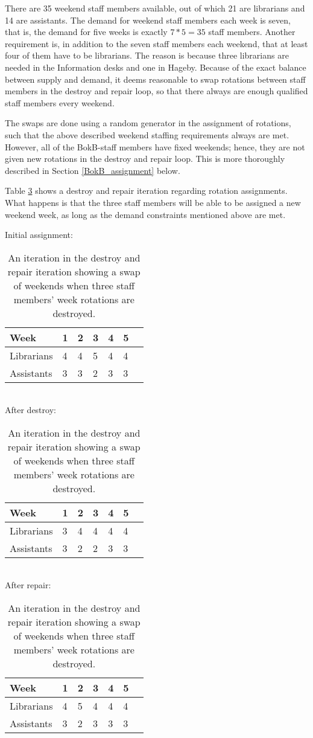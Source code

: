 There are 35 weekend staff members available, out of which 21 are librarians and 14 are assistants. The demand for weekend staff members each week is seven, that is, the demand for five weeks is exactly $7*5 = 35$ staff members. Another requirement is, in addition to the seven staff members each weekend, that at least four of them have to be librarians. The reason is because three librarians are needed in the Information desks and one in Hageby. Because of the exact balance between supply and demand, it deems reasonable to swap rotations between staff members in the destroy and repair loop, so that there always are enough qualified staff members every weekend.

The swaps are done using a random generator in the assignment of rotations, such that the above described weekend staffing requirements always are met. However, all of the BokB-staff members have fixed weekends; hence, they are not given new rotations in the destroy and repair loop. This is more thoroughly described in Section \ref{BokB_assignment} below. 

Table \ref{rotation_assignment} shows a destroy and repair iteration regarding rotation assignments. What happens is that the three staff members will be able to be assigned a new weekend week, as long as the demand constraints mentioned above are met.

\begin{table}[!h]
\centering
\caption{An iteration in the destroy and repair iteration showing a swap of weekends when three staff members' week rotations are destroyed.}
\label{rotation_assignment}
Initial assignment:\\
\begin{tabular}{l|llllll}
\rowcolor[HTML]{C0C0C0}
Week       & 1 & 2 & 3 & 4 & 5  \\ \hline
Librarians & 4 & 4 & 5 & 4 & 4  \\ \hline
Assistants & 3 & 3 & 2 & 3 & 3 
\end{tabular}\\
After destroy:\\
\begin{tabular}{l|llllll}
\rowcolor[HTML]{C0C0C0}
Week       & 1                         & 2                         & 3                         & 4                         & 5                          \\ \hline
Librarians & \cellcolor[HTML]{FFFE65}3 & 4 & \cellcolor[HTML]{FFFE65}4 & 4 & 4  \\ \hline
Assistants & 3 & \cellcolor[HTML]{FFFE65}2 & 2 & 3 & 3
\end{tabular}\\
After repair:\\
\begin{tabular}{l|llllll}
\rowcolor[HTML]{C0C0C0}
Week       & 1 & 2 & 3 & 4 & 5  \\ \hline
Librarians & \cellcolor[HTML]{9AFF99}4 & \cellcolor[HTML]{9AFF99}5 & 4 & 4 & 4  \\ \hline
Assistants & 3 & 2 & \cellcolor[HTML]{9AFF99}3 & 3 & 3 
\end{tabular}
\end{table}

